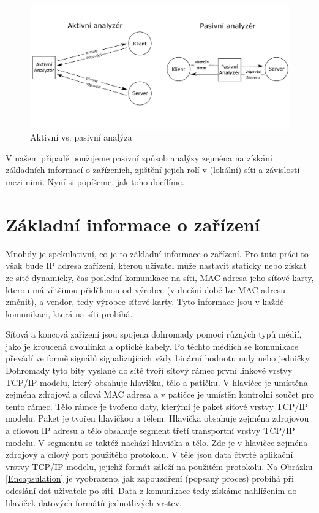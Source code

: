 \documentclass[thesis=B,czech,hidelinks]{FITthesis}[2019/03/21]
\begin{document}
    \begin{figure}
        \centering
        \includegraphics[width=\textwidth]{Active_Passive.pdf}
        \caption[Aktivní vs. pasivní analýza]{Aktivní vs. pasivní analýza}
        \label{PassiveVSAcite}
    \end{figure}
    
    V našem případě použijeme pasivní způsob analýzy zejména na získání základních informací o zařízeních, zjištění jejich rolí v (lokální) síti a závislostí mezi nimi. Nyní si popíšeme, jak toho docílíme.
    \section{Základní informace o zařízení}
    Mnohdy je spekulativní, co je to základní informace o zařízení. Pro tuto práci to však bude IP adresa zařízení, kterou uživatel může nastavit staticky nebo získat ze sítě dynamicky, čas poslední komunikace na síti, MAC adresa jeho síťové karty, kterou má většinou přidělenou od výrobce (v dnešní době lze MAC adresu změnit), a vendor, tedy výrobce síťové karty. Tyto informace jsou v každé komunikaci, která na síti probíhá. 
    
    Síťová a koncová zařízení jsou spojena dohromady pomocí různých typů médií, jako je kroucená dvoulinka a optické kabely. Po těchto médiích se komunikace převádí ve formě signálů signalizujících vždy binární hodnotu nuly nebo jedničky. Dohromady tyto bity vyslané do sítě tvoří síťový rámec první linkové vrstvy TCP/IP modelu, který obsahuje hlavičku, tělo a patičku. V hlavičce je umístěna zejména zdrojová a cílová MAC adresa a v patičce je umístěn kontrolní součet pro tento rámec. Tělo rámce je tvořeno daty, kterými je paket síťové vrstvy TCP/IP modelu. Paket je tvořen hlavičkou a tělem. Hlavička obsahuje zejména zdrojovou a cílovou IP adresu a tělo obsahuje segment třetí transportní vrstvy TCP/IP modelu. V segmentu se taktéž nachází hlavička a tělo. Zde je v hlavičce zejména zdrojový a cílový port použitého protokolu. V těle jsou data čtvrté aplikační vrstvy TCP/IP modelu, jejichž formát záleží na použitém protokolu. Na Obrázku \ref{Encapsulation} je vyobrazeno, jak zapouzdření (popsaný proces) probíhá při odeslání dat uživatele po síti. Data z komunikace tedy získáme nahlížením do hlaviček datových formátů jednotlivých vrstev.
    
\end{document}
